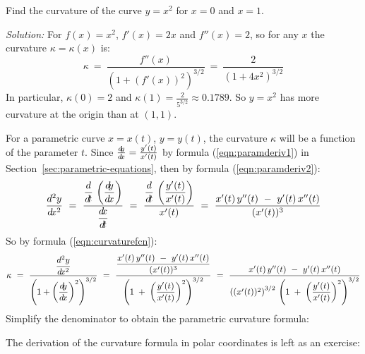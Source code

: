 \begin{exmp}
\noindent Find the curvature of the curve $y=x^2$ for $x=0$ and
$x=1$.\vspace{1mm}
\par\noindent\emph{Solution:} For $f(x)=x^2$, $f'(x)=2x$ and $f''(x)=2$, so for
any $x$ the curvature $\kappa=\kappa(x)$ is:
\[
\kappa ~=~ \frac{f''(x)}{(1 + (f'(x))^2)^{3/2}} ~=~ \frac{2}{(1+4x^2)^{3/2}}
\]
In particular, $\kappa(0)=2$ and $\kappa(1)=\frac{2}{5^{3/2}} \approx 0.1789$.
So $y=x^2$ has more curvature at the origin than at $(1,1)$.
\end{exmp}
\divider
\newpage
For a parametric curve $x=x(t)$, $y=y(t)$, the curvature $\kappa$ will be a
function of the parameter $t$. Since $\frac{d\negmedspace y}{d\!x} = \frac{y'(t)}{x'(t)}$ by formula
(\ref{eqn:paramderiv1}) in Section~\ref{sec:parametric-equations}, then by formula (\ref{eqn:paramderiv2}):
\[
\frac{d^2y}{d\!x^2} ~=~ \frac{\dfrac{d}{d\!t}\,\left(\dfrac{d\negmedspace y}{d\!x}\right)}{\dfrac{d\negmedspace x}{d\!t}} ~=~
\frac{\dfrac{d}{d\!t}\,\left(\dfrac{y'(t)}{x'(t)}\right)}{x'(t)} ~=~
\frac{x'(t)\,y''(t) ~-~ y'(t)\,x''(t)}{(x'(t))^3}
\]
So by formula (\ref{eqn:curvaturefcn}):
\[
\kappa ~=~ \frac{\dfrac{d^2y}{d\!x^2}}{\left(1 + \left(\dfrac{d\negmedspace y}{d\!x}\right)^2\right)^{3/2}} ~=~
\frac{\dfrac{x'(t)\,y''(t) ~-~ y'(t)\,x''(t)}{(x'(t))^3}}{\left(1 \;+\;
\left(\dfrac{y'(t)}{x'(t)}\right)^2\right)^{3/2}} ~=~
\frac{x'(t)\,y''(t) ~-~ y'(t)\,x''(t)}{\left((x'(t))^2\right)^{3/2} \,\left(1 \;+\;
\left(\dfrac{y'(t)}{x'(t)}\right)^2\right)^{3/2}}
\]
Simplify the denominator to obtain the parametric curvature formula:


\noindent The derivation of the curvature formula in polar coordinates is left
as an exercise:


